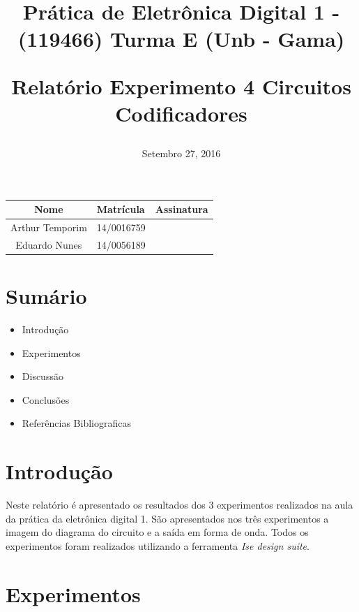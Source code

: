 \documentclass[12pts]{article}
\title{
	Prática de Eletrônica Digital 1 - (119466)
	\singlespacing
		Turma E (Unb - Gama)
	\singlespacing
	\begin{midpage}
	\begin {large}
		Relatório Experimento 4
		\singlespace
		Circuitos Codificadores
	\end {large}
	\end{midpage}
}
\date{Setembro 27, 2016}
\begin{document}
\maketitle	
\begin{center}

\begin{tabular}{|c|l|r|}
\hline
Nome & Matrícula & Assinatura\\
\hline
Arthur Temporim & 14/0016759 & \\
\hline	
Eduardo Nunes & 14/0056189 & \\
\hline	
\end{tabular}

\end{center}


\newpage

\section{Sumário}

\begin{itemize}
	\item Introdução
	\singlespacing
	\item Experimentos
	\singlespacing
	\item Discussão
	\singlespacing
	\item Conclusões 
	\singlespacing
	\item Referências Bibliograficas
	\singlespacing
\end{itemize}

\newpage


\section{Introdução}

	Neste relatório é apresentado os resultados dos 3 experimentos realizados na aula da prática da eletrônica digital 1.
	São apresentados nos três experimentos a imagem do diagrama do circuito e a saída em forma de onda. Todos os experimentos foram realizados utilizando a ferramenta \textit{Ise design suite}.

\section{Experimentos}

\end{document}
